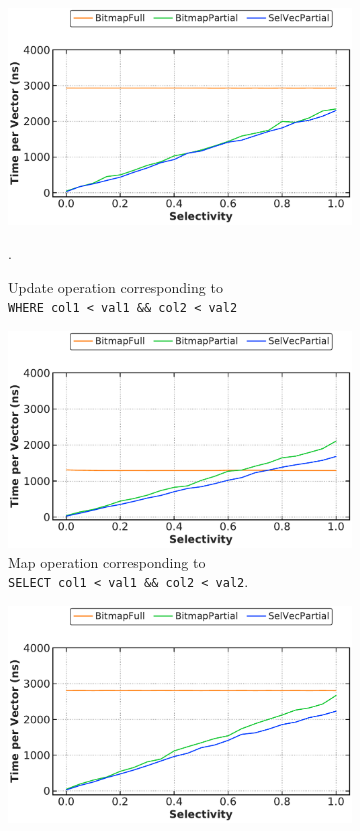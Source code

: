 \documentclass[12pt]{cmuthesis}
\begin{document}
\begin{figure}[t!]
\centering
\begin{subfigure}[t]{.49\linewidth}
 \centering
 \includegraphics[width=0.9\linewidth]{eval/logical_and_update.pdf}
 \caption{Update operation corresponding to \\ \texttt{\footnotesize WHERE col1 < val1 \&\& col2 < val2}}.
  \label{fig:logical_and_update}
\end{subfigure}%
\begin{subfigure}[t]{.49\linewidth}
 \centering
 \includegraphics[width=0.9\linewidth]{eval/logical_and_map.pdf}
 \caption{Map operation corresponding to \\ \texttt{\footnotesize SELECT col1 < val1 \&\& col2 < val2}.}
  \label{fig:logical_and_map}
\end{subfigure}
\begin{subfigure}[t]{.49\linewidth}
 \centering
 \includegraphics[width=0.9\linewidth]{eval/logical_or_update.pdf}

\end{subfigure}
\end{figure}
\end{document}
